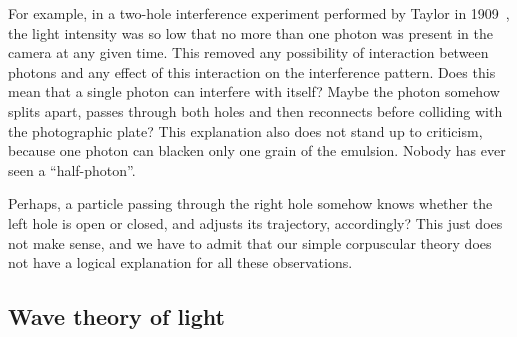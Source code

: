\documentclass[nochecklpage]{stefan1}
\theoremstyle{definition}
\begin{document}
For example, in a two-hole interference experiment performed by Taylor
in 1909~\cite{Taylor}, the light intensity was so low that no more
than one photon was present in the camera at any given time. This
removed any possibility of interaction between photons and any effect
of this interaction on the interference pattern. Does this mean that a
single photon can interfere with itself? Maybe the photon somehow splits
apart, passes through both holes and then reconnects before colliding
with the photographic plate? This explanation also does not stand up to
criticism, because one photon can blacken only one grain of the
emulsion. Nobody has ever seen a ``half-photon''.

Perhaps, a particle passing through the right hole somehow knows whether
the left hole is open or closed, and adjusts its trajectory,
accordingly? This just does not make sense, and we have to admit that
our simple corpuscular theory does not have a logical explanation for all these observations.

\vspace*{-3pt}
\subsection{Wave theory of light}\label{ss:wave}
\vspace*{-3pt}
\end{document}
